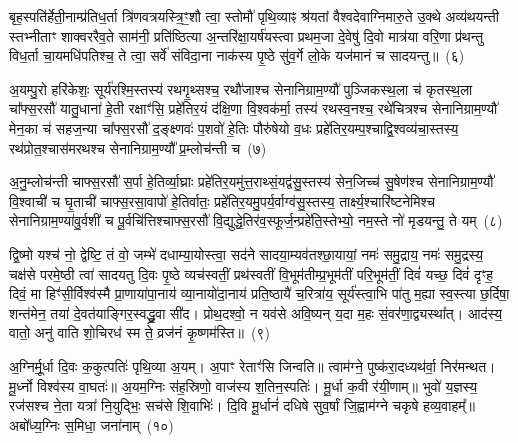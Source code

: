 बृह॒स्पति॑र्\mbox{}हेती॒नाम्प्र॑तिध॒र्ता त्रि॑णवत्रयस्त्रि॒ꣳ॒शौ त्वा॒ स्तोमौ॑ पृथि॒व्याꣴ श्र॑यतां वैश्वदेवाग्निमारु॒ते उ॒क्थे अव्य॑थयन्ती स्तभ्नीताꣳ शाक्वररैव॒ते साम॑नी॒ प्रति॑ष्ठित्या अ॒न्तरि॑क्षा॒यर्\mbox{}ष॑यस्त्वा प्रथम॒जा दे॒वेषु॑ दि॒वो मात्र॑या वरि॒णा प्र॑थन्तु विध॒र्ता चा॒यमधि॑पतिश्च॒ ते त्वा॒ सर्वे॑ संविदा॒ना नाक॑स्य पृ॒ष्ठे सु॑व॒र्गे लो॒के यज॑मानं च सादयन्तु॥~(६)

{\anuvakamend[{प्र॒तीची॒ दिङ्म॒रुत॑स्ते दे॒वा अधि॑पतयश्चत्वारि॒ꣳ॒शच्च॑}]}%

अ॒यम्पु॒रो हरि॑केशः॒ सूर्य॑रश्मि॒स्तस्य॑ रथगृ॒थ्सश्च॒ रथौ॑जाश्च सेनानिग्राम॒ण्यौ॑ पुञ्जिकस्थ॒ला च॑ कृतस्थ॒ला चा᳚फ्स॒रसौ॑ यातु॒धाना॑ हे॒ती रक्षाꣳ॑सि॒ प्रहे॑तिर॒यं द॑क्षि॒णा वि॒श्वक॑र्मा॒ तस्य॑ रथस्व॒नश्च॒ रथे॑चित्रश्च सेनानिग्राम॒ण्यौ॑ मेन॒का च॑ सहज॒न्या चा᳚फ्स॒रसौ॑ द॒ङ्क्ष्णवः॑ प॒शवो॑ हे॒तिः पौरु॑षेयो व॒धः प्रहे॑तिर॒यम्प॒श्चाद्वि॒श्वव्य॑चा॒स्तस्य॒ रथ॑प्रोत॒श्चास॑मरथश्च सेनानिग्राम॒ण्यौ᳚ प्र॒म्लोच॑न्ती च~(७)

अ॒नु॒म्लोच॑न्ती चाफ्स॒रसौ॑ स॒र्पा हे॒तिर्व्या॒घ्राः प्रहे॑तिर॒यमु॑त्त॒राथ्सं॒यद्व॑सु॒स्तस्य॑ सेन॒जिच्च॑ सु॒षेण॑श्च सेनानिग्राम॒ण्यौ॑ वि॒श्वाची॑ च घृ॒ताची॑ चाफ्स॒रसा॒वापो॑ हे॒तिर्वातः॒ प्रहे॑तिर॒यमु॒पर्य॒र्वाग्व॑सु॒स्तस्य॒ तार्क्ष्य॒श्चारि॑ष्टनेमिश्च सेनानिग्राम॒ण्या॑\-वु॒र्वशी॑ च पू॒र्वचि॑त्तिश्चाफ्स॒रसौ॑ वि॒द्युद्धे॒तिर॑व॒स्फूर्ज॒न्प्रहे॑ति॒स्तेभ्यो॒ नम॒स्ते नो॑ मृडयन्तु॒ ते यम्~(८)

द्वि॒ष्मो यश्च॑ नो॒ द्वेष्टि॒ तं वो॒ जम्भे॑ दधाम्या॒योस्त्वा॒ सद॑ने सादया॒म्यव॑तश्छा॒यायां॒ नमः॑ समु॒द्राय॒ नमः॑ समु॒द्रस्य॒ चक्ष॑से परमे॒ष्ठी त्वा॑ सादयतु दि॒वः पृ॒ष्ठे व्यच॑स्वतीं॒ प्रथ॑स्वतीं वि॒भूम॑तीम्प्र॒भूम॑तीं परि॒भूम॑तीं॒ दिवं॑ यच्छ॒ दिवं॑ दृꣳह॒ दिवं॒ मा हिꣳ॑सी॒र्विश्व॑स्मै प्रा॒णाया॑पा॒नाय॑ व्या॒नायो॑दा॒नाय॑ प्रति॒ष्ठायै॑ च॒रित्रा॑य॒ सूर्य॑स्त्वा॒भि पा॑तु म॒ह्या स्व॒स्त्या छ॒र्दिषा॒ शन्त॑मेन॒ तया॑ दे॒वत॑याङ्गिर॒स्वद्ध्रु॒वा सी॑द। प्रोथ॒दश्वो॒ न यव॑से अवि॒ष्यन् य॒दा म॒हः सं॒वर॑णा॒द्व्यस्था᳚त्। आद॑स्य॒ वातो॒ अनु॑ वाति शो॒चिरध॑ स्म ते॒ व्रज॑नं कृ॒ष्णम॑स्ति॥~(९)

{\anuvakamend[{प्र॒म्लोच॑न्ती च॒ यꣴ स्व॒स्त्याष्टाविꣳ॑शतिश्च}]}%

अ॒ग्निर्मू॒र्धा दि॒वः क॒कुत्पतिः॑ पृथि॒व्या अ॒यम्। अ॒पाꣳ रेताꣳ॑सि जिन्वति॥ त्वाम॑ग्ने॒ पुष्क॑रा॒दध्यथ॑र्वा॒ निर॑मन्थत। मू॒र्ध्नो विश्व॑स्य वा॒घतः॑॥ अ॒यम॒ग्निः स॑ह॒स्रिणो॒ वाज॑स्य श॒तिन॒स्पतिः॑। मू॒र्धा क॒वी र॑यी॒णाम्॥ भुवो॑ य॒ज्ञस्य॒ रज॑सश्च ने॒ता यत्रा॑ नि॒युद्भिः॒ सच॑से शि॒वाभिः॑। दि॒वि मू॒र्धानं॑ दधिषे सुव॒र्\mbox{}षां जि॒ह्वाम॑ग्ने चकृषे हव्य॒वाहम्᳚॥ अबो᳚ध्य॒ग्निः स॒मिधा॒ जना॑नाम्~(१०)

